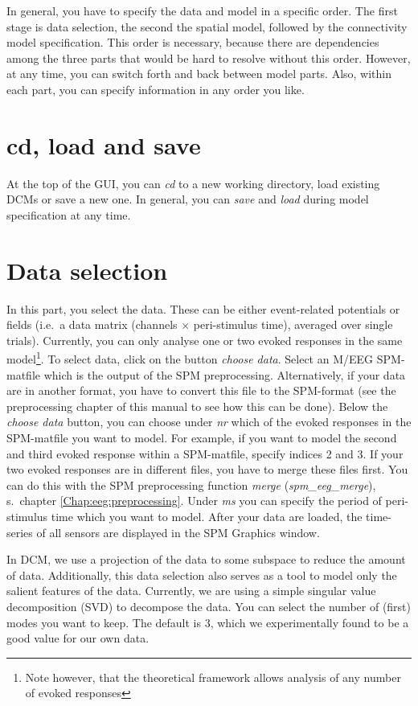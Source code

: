 In general, you have to specify the data and model in a specific
order. The first stage is data selection, the second the spatial model,
followed by the connectivity model specification. This order is
necessary, because there are dependencies among the three parts that
would be hard to resolve without this order. However, at any time, you
can switch forth and back between model parts. Also, within each part,
you can specify information in any order you like.

\section{cd, load and save}
At the top of the GUI, you can \textit{cd} to a new working directory,
load existing DCMs or save a new one. In general, you can
\textit{save} and \textit{load} during model
specification at any time.

\section{Data selection}
In this part, you select the data. These can be either event-related
potentials or fields (i.e.~a data matrix (channels $\times$
peri-stimulus time), averaged over single trials). Currently, you can
only analyse one or two evoked responses in the same
model\footnote{Note however, that the theoretical framework allows
  analysis of any number of evoked responses}. To select
data, click on the button \textit{choose data}. Select an M/EEG
SPM-matfile which is the output of the SPM preprocessing. Alternatively, if your
data are in another format, you have to convert this file to the
SPM-format (see the preprocessing chapter of this manual to see how
this can be done). Below the \textit{choose data} button, you can
choose under \textit{nr} which of the evoked responses in the
SPM-matfile you want to model. For example, if you want to model the
second and third evoked response within a SPM-matfile, specify
indices 2 and 3. If your two evoked responses are in different files,
you have to merge these files first. You can do this with the SPM
preprocessing function \textit{merge} (\textit{spm\_eeg\_merge}),
s.~chapter \ref{Chap:eeg:preprocessing}.
Under \textit{ms} you can specify the period of peri-stimulus time
which you want to model. After your data are loaded, the time-series of
all sensors are displayed in the SPM Graphics window. 

In DCM, we use a projection of the data to some subspace to reduce the
amount of data. Additionally, this data selection also serves as a
tool to model only the salient features of the
data. Currently, we are using a simple singular value decomposition
(SVD) to decompose the data. You can select the number of (first)
modes you want to keep. The default is 3, which we experimentally
found to be a good value for our own data.

